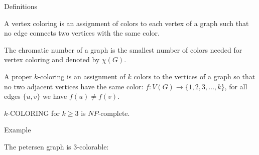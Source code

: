 \documentclass{beamer}
\begin{document}
\begin{frame}{Definitions}


\begin{definition}
A \color{red} vertex coloring \color{black} is an assignment of colors to each vertex of a graph such that no edge connects two vertices with the same  color.
\end{definition}
 
\begin{definition}
The \color{red} chromatic number \color{black} of a graph is the smallest number of colors needed for vertex coloring and denoted by $\chi(G)$. 
\end{definition}
 
\begin{definition}
A \color{red} proper $k$-coloring \color{black} is an assignment of $k$ colors to the vertices of a graph so that no two adjacent vertices have the same color: $f: V(G) \to \{1, 2, 3, . . . , k\}$, for all edges $\{u, v\}$ we have $f(u) \not= f(v)$.
\end{definition}
 
\begin{theorem}
$k$-COLORING for $k \geq 3$ is $NP$-complete.
\end{theorem}
\end{frame}


\begin{frame}{Example}
\begin{example}
The petersen graph is $3$-colorable:

\begin{center}
\end{center}
\end{example}
\end{frame}
\end{document}
